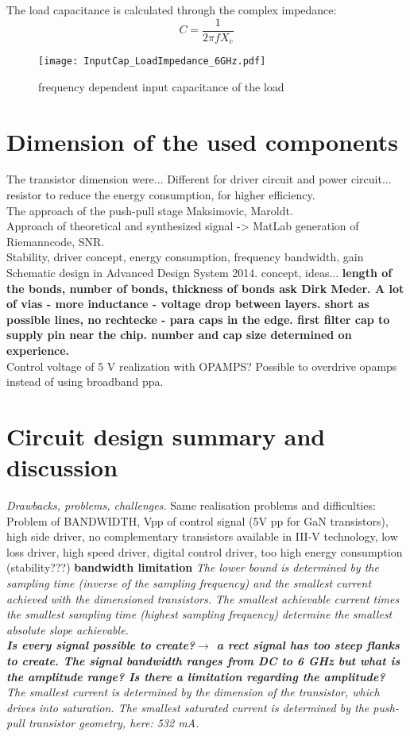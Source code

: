 The load capacitance is calculated through the complex impedance:
\begin{equation}
C = \frac{1}{2 \pi f X_c}
\end{equation}

 \begin{figure}[ht]
	\centering
  \texttt{[image: InputCap\_LoadImpedance\_6GHz.pdf]}
	\caption{frequency dependent input capacitance of the load}
	\label{fig:smith_load_impedance_inC}
\end{figure}

\section{Dimension of the used components}
The transistor dimension were... Different for driver circuit and power circuit... resistor to reduce the energy  consumption, for higher efficiency. \\ The
approach of the push-pull stage Maksimovic, Maroldt.\\
Approach of theoretical and synthesized signal -> MatLab generation of Riemanncode, SNR.\\ Stability, driver concept, energy consumption, frequency bandwidth, gain
Schematic design in Advanced Design System 2014. concept, ideas... 
\textbf{length of the bonds, number of bonds, thickness of bonds ask Dirk Meder. A lot of vias - more inductance - voltage drop between layers. short as possible lines, no rechtecke - para caps in the edge. first filter cap to supply pin near the chip. number and cap size determined on experience. }\\
Control voltage of 5 V realization with OPAMPS? Possible to overdrive opamps instead of using broadband ppa. 


\section{Circuit design summary and discussion}
\textit{Drawbacks, problems, challenges.}
Same realisation problems and difficulties: Problem of BANDWIDTH, Vpp of control signal (5V pp for GaN transistors), high side driver, no complementary transistors available in III-V technology, low loss driver, high speed driver, digital control driver, too high energy consumption (stability???)
\textbf{bandwidth limitation}
\textit{The lower bound is determined by the sampling time (inverse of the sampling frequency) and the smallest current achieved with the dimensioned transistors.
 The smallest achievable current times the smallest sampling time (highest sampling frequency) determine the smallest absolute slope achievable. \\
 \textbf{Is every signal possible to create?$\rightarrow$ a rect signal has too steep flanks to create. The signal bandwidth ranges from DC to 6 GHz but what is the amplitude range? Is there a limitation regarding the amplitude?}
\\
The smallest current is determined by the dimension of the transistor, which drives into saturation. 
The smallest saturated current is determined by the push-pull transistor geometry, here: 532 mA.}